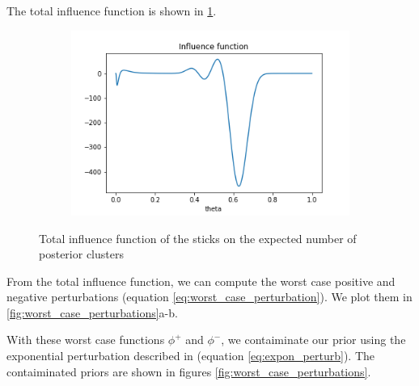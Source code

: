 \documentclass[a4paper]{article}
\begin{document}
The total influence function is shown in \ref{fig:influence_func}.

\begin{figure}[h!]
	\centering
	\begin{subfigure}[t]{0.4\textwidth}
		\includegraphics[width = \textwidth]{./func_sens_results/influence_func.png}
	\end{subfigure}
	\caption{Total influence function of the sticks on the expected number of
  posterior clusters}
	\label{fig:influence_func}
\end{figure}

From the total influence function, we can compute the worst case positive and negative
perturbations (equation \ref{eq:worst_case_perturbation}).
We plot them in \ref{fig:worst_case_perturbations}a-b.

With these worst case functions $\phi^+$ and $\phi^-$, we contaiminate our prior
using the exponential perturbation described in (equation \ref{eq:expon_perturb}).
The contaiminated priors are shown in figures \ref{fig:worst_case_perturbations}.
\end{document}
